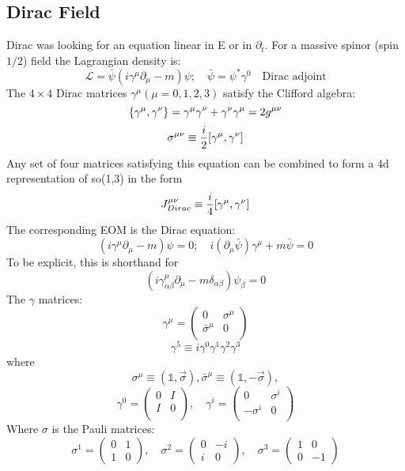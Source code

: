 \subsection{Dirac Field}
Dirac was looking for an equation linear in E or in $\partial_t$. For a
massive spinor (spin $1/2$) field the Lagrangian density is:
$$ \mathcal{L} = \bar{\psi}(i\gamma^{\mu}\partial_{\mu} - m)\psi; \quad
\bar{\psi} = \psi^{*}\gamma^{0} \quad \text{Dirac adjoint} $$
The $4 \times 4$ Dirac matrices $\gamma^{\mu} (\mu = 0,1,2,3)$ satisfy the
Clifford algebra:
\[ \{\gamma^{\mu},\gamma^{\nu}\}=\gamma^{\mu}\gamma^{\nu}+\gamma^{\nu}\gamma^{\mu}=2g^{\mu\nu} \]
\[
    \sigma^{\mu\nu} \equiv \frac{i}{2}[\gamma^{\mu}, \gamma^{\nu}]
    \]
Any set of four matrices satisfying this equation can be combined to form a
4d representation of so(1,3) in the form
\[
    J^{\mu\nu}_{Dirac} \equiv \frac{i}{4}[\gamma^\mu, \gamma^\nu]
    \]
The corresponding EOM is the Dirac equation:
$$ (i\gamma^{\mu}\partial_{\mu} - m) \psi =0;	\quad
i(\partial_{\mu}\bar{\psi})\gamma^{\mu} + m\bar{\psi} = 0$$
To be explicit, this is shorthand for
\[
    (i\gamma^\mu_{\alpha\beta}\partial_\mu-m\delta_{\alpha\beta})\psi_\beta = 0
    \]
The $\gamma$ matrices:
\[
    \gamma^{\mu} = 
    \begin{pmatrix}
	0   & \sigma^{\mu}  \\
	\bar{\sigma}^{\mu}  & 0	\\
    \end{pmatrix}
\]
\[
    \gamma^5\equiv{i}\gamma^0\gamma^1\gamma^2\gamma^3
    \]
where
\[
    \sigma^\mu\equiv(\mathds{1},\vec{\sigma}),
    \bar{\sigma}^\mu\equiv(\mathds{1},-\vec{\sigma}),
\]
\[ \gamma^{0} = 
    \begin{pmatrix}
	0   & I	\\
	I   & 0	\\	
    \end{pmatrix}, \quad
    \gamma^{i} = 
    \begin{pmatrix}
	0   & \sigma^{i}    \\
	-\sigma^{i} & 0	    \\
    \end{pmatrix}
\]
Where \textbf{$\sigma$} is the Pauli matrices:
\begin{equation}
    \sigma^{1} = 
	\begin{pmatrix}
	    0	& 1 \\
	    1	& 0 
	\end{pmatrix},	\quad
    \sigma^{2} = 
	\begin{pmatrix}
	    0	& -i \\
	    i	& 0 
	\end{pmatrix},	\quad
    \sigma^{3} = 
	\begin{pmatrix}
	    1	& 0 \\
	    0	& -1 
	\end{pmatrix}
    \label{Pauli Matrices}
\end{equation}
